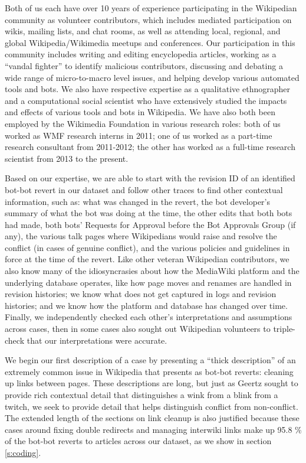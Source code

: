 \documentclass[format=acmsmall, review=false, screen=true]{acmart}%
\begin{document}
Both of us each have over 10 years of experience participating in the Wikipedian community as volunteer contributors, which includes mediated participation on wikis, mailing lists, and chat rooms, as well as attending local, regional, and global Wikipedia/Wikimedia meetups and conferences. Our participation in this community includes writing and editing encyclopedia articles, working as a ``vandal fighter'' to identify malicious contributors, discussing and debating a wide range of micro-to-macro level issues, and helping develop various automated tools and bots. We also have respective expertise as a qualitative ethnographer and a computational social scientist who have extensively studied the impacts and effects of various tools and bots in Wikipedia. We have also both been employed by the Wikimedia Foundation in various research roles: both of us worked as WMF research interns in 2011; one of us worked as a part-time research consultant from 2011-2012; the other has worked as a full-time research scientist from 2013 to the present.

Based on our expertise, we are able to start with the revision ID of an identified bot-bot revert in our dataset and follow other traces to find other contextual information, such as: what was changed in the revert, the bot developer's summary of what the bot was doing at the time, the other edits that both bots had made, both bots' Requests for Approval before the Bot Approvals Group (if any), the various talk pages where Wikipedians would raise and resolve the conflict (in cases of genuine conflict), and the various policies and guidelines in force at the time of the revert. Like other veteran Wikipedian contributors, we also know many of the idiosyncrasies about how the MediaWiki platform and the underlying database operates, like how page moves and renames are handled in revision histories; we know what does not get captured in logs and revision histories; and we know how the platform and database has changed over time. Finally, we independently checked each other's interpretations and assumptions across cases, then in some cases also sought out Wikipedian volunteers to triple-check that our interpretations were accurate. 

We begin our first description of a case by presenting a ``thick description'' \cite{Geertz1973} of an extremely common issue in Wikipedia that presents as bot-bot reverts: cleaning up links between pages. These descriptions are long, but just as Geertz sought to provide rich contextual detail that distinguishes a wink from a blink from a twitch, we seek to provide detail that helps distinguish conflict from non-conflict. The extended length of the sections on link cleanup is also justified because these cases around fixing double redirects and managing interwiki links make up 95.8 \% of the bot-bot reverts to articles across our dataset, as we show in section \ref{s:coding}. 
\end{document}
